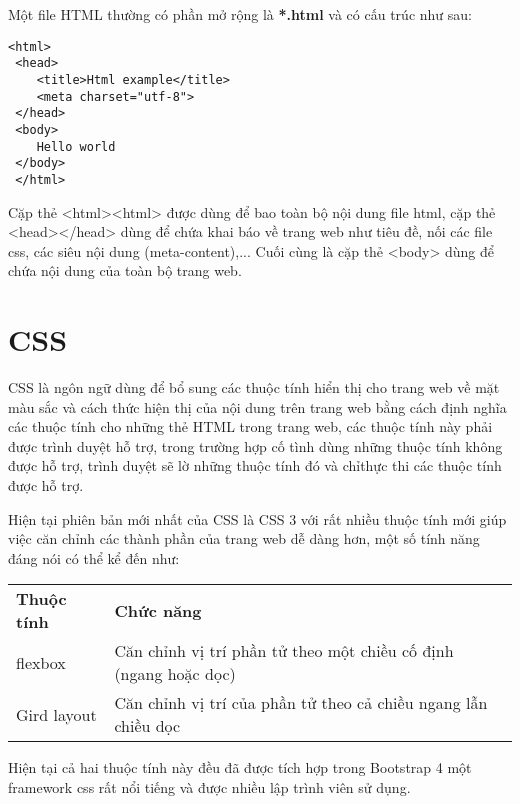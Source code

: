 Một file HTML thường có phần mở rộng là \textbf{*.html} và có cấu trúc như sau:
\lstset{language=Html}
\begin{center}
	\begin{lstlisting}[frame=single]
 <html>
 <head>
    <title>Html example</title>
    <meta charset="utf-8">
 </head>
 <body>
    Hello world
 </body>
 </html>
\end{lstlisting}
\end{center}
Cặp thẻ <html><html> được dùng để bao toàn bộ nội dung file html, cặp thẻ <head></head> dùng để chứa khai báo về trang web như tiêu đề, nối các file css, các siêu nội dung (meta-content),... Cuối cùng là cặp thẻ <body> dùng để chứa nội dung của toàn bộ trang web.
\section{CSS}
CSS là ngôn ngữ dùng để bổ sung các thuộc tính hiển thị cho trang web về mặt màu sắc và cách thức hiện thị của nội dung trên trang web bằng cách định nghĩa các thuộc tính cho những thẻ HTML trong trang web, các thuộc tính này phải được trình duyệt hỗ trợ, trong trường hợp cố tình dùng những thuộc tính không được hỗ trợ, trình duyệt sẽ lờ những thuộc tính đó và chỉthực thi các thuộc tính được hỗ trợ.\par
Hiện tại phiên bản mới nhất của CSS là CSS 3 với rất nhiều thuộc tính mới giúp việc căn chỉnh các thành phần của trang web dễ dàng hơn, một số tính năng đáng nói có thể kể đến như:

\begin{table}[h!]
	\centering
	\begin{tabular}{|l|l|}
		\cline{1-2}
		\textbf{Thuộc tính} & \textbf{Chức năng}                                               \\ \cline{1-2}
		flexbox             & Căn chỉnh vị trí phần tử theo một chiều cố định (ngang hoặc dọc) \\ \cline{1-2}
		Gird layout         & Căn chỉnh vị trí của phần tử theo cả chiều ngang lẫn chiều dọc   \\ \cline{1-2}
	\end{tabular}
\end{table}

Hiện tại cả hai thuộc tính này đều đã được tích hợp trong Bootstrap 4 một framework css rất nổi tiếng và được nhiều lập trình viên sử dụng.
